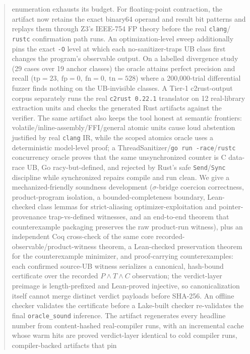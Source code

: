 \documentclass[10pt,a4paper]{article}
\begin{document}
\begin{abstract}
enumeration exhausts its budget. For floating-point contraction,
the artifact now retains the exact binary64 operand and result bit patterns and
replays them through Z3's IEEE-754 FP theory before the real \texttt{clang}/
\texttt{rustc} confirmation path runs. An optimization-level sweep
additionally pins the exact
\texttt{-O} level at which each no-sanitizer-traps UB class first changes the
program's observable output. On a labelled divergence study (29 cases over 19
anchor classes) the oracle attains perfect precision and recall ($\mathrm{tp}=23,\
\mathrm{fp}=0,\ \mathrm{fn}=0,\
\mathrm{tn}=528$) where a 200{,}000-trial differential fuzzer finds nothing on
the UB-invisible classes. A Tier-1 c2rust-output corpus separately runs the real
\texttt{c2rust 0.22.1} translator on 12 real-library extraction units and checks
the generated Rust artifacts against the verifier. The same artifact also keeps
the tool honest at semantic frontiers: volatile/inline-assembly/FFI/general
atomic units cause loud abstention justified by real \texttt{clang} IR, while
the scoped atomics oracle uses a deterministic model-level proof; a
ThreadSanitizer/\texttt{go run -race}/\texttt{rustc} concurrency oracle proves
that the same unsynchronized counter is C data-race UB, Go racy-but-defined, and
rejected by Rust's safe \texttt{Send}/\texttt{Sync} discipline while synchronized
repairs compile and run clean. We give a mechanized-friendly soundness development
($\sigma$-bridge coercion correctness, product-program isolation, a
bounded-completeness boundary, Lean-checked class lemmas for strict-aliasing
optimizer-exploitation and pointer-provenance trap-vs-defined witnesses, and an
end-to-end theorem that counterexample packaging preserves the raw product-run
witness), plus an independent Coq cross-check of the same core
recorded-observable/product-witness theorem, a Lean-checked preservation theorem
for the counterexample minimizer, and proof-carrying counterexamples:
each confirmed source-UB witness serializes a canonical, hash-bound certificate
over the recorded \(P\wedge T\wedge C\) observation; the verdict-layer preimage is
length-prefixed and Lean-proved injective, so canonicalization itself cannot merge
distinct verdict payloads before SHA-256.  An offline checker validates the
certificate before a Lake-built checker re-validates the final
\texttt{oracle\_sound} inference.  The artifact regenerates every headline number from content-hashed
real-compiler runs, with an incremental cache whose warm hits are proved
verdict-layer identical to cold compiler runs, compiler-backed artifacts that pin

\end{abstract}
\end{document}
